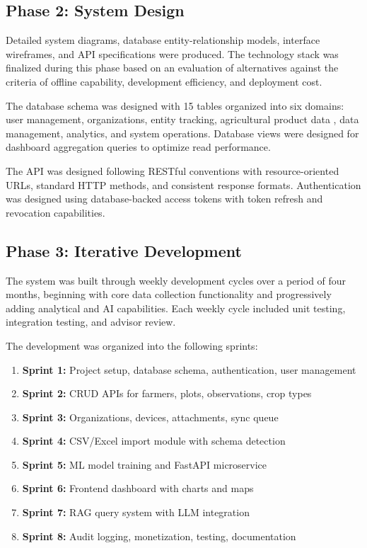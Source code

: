 \subsection{Phase 2: System Design}

Detailed system diagrams, database entity-relationship models, interface wireframes, and API specifications were produced. The technology stack was finalized during this phase based on an evaluation of alternatives against the criteria of offline capability, development efficiency, and deployment cost.

The database schema was designed with 15 tables organized into six domains: user management, organizations, entity tracking, agricultural product data , data management, analytics, and system operations. Database views were designed for dashboard aggregation queries to optimize read performance.

The API was designed following RESTful conventions with resource-oriented URLs, standard HTTP methods, and consistent response formats. Authentication was designed using database-backed access tokens with token refresh and revocation capabilities.

\subsection{Phase 3: Iterative Development}

The system was built through weekly development cycles over a period of four months, beginning with core data collection functionality and progressively adding analytical and AI capabilities. Each weekly cycle included unit testing, integration testing, and advisor review.

The development was organized into the following sprints:
\begin{enumerate}
  \item \textbf{Sprint 1:} Project setup, database schema, authentication, user management
  \item \textbf{Sprint 2:} CRUD APIs for farmers, plots, observations, crop types
  \item \textbf{Sprint 3:} Organizations, devices, attachments, sync queue
  \item \textbf{Sprint 4:} CSV/Excel import module with schema detection
  \item \textbf{Sprint 5:} ML model training and FastAPI microservice
  \item \textbf{Sprint 6:} Frontend dashboard with charts and maps
  \item \textbf{Sprint 7:} RAG query system with LLM integration
  \item \textbf{Sprint 8:} Audit logging, monetization, testing, documentation
\end{enumerate}


